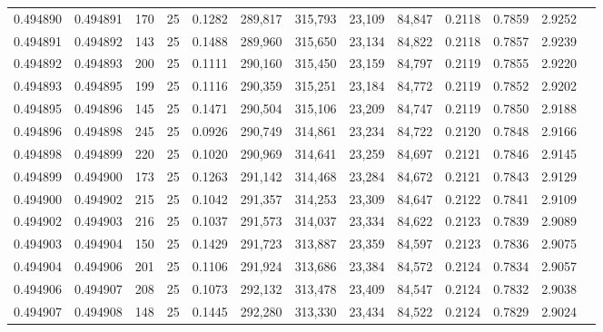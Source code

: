 \begin{tabular}{rrrrrrrrrrrrr}
0.494890 & 0.494891 &   170 &  25 &                                     0.1282 & 289,817 & 315,793 &  23,109 &  84,847 & 0.2118 & 0.7859 & 2.9252 \\
0.494891 & 0.494892 &   143 &  25 &                                     0.1488 & 289,960 & 315,650 &  23,134 &  84,822 & 0.2118 & 0.7857 & 2.9239 \\
0.494892 & 0.494893 &   200 &  25 &                                     0.1111 & 290,160 & 315,450 &  23,159 &  84,797 & 0.2119 & 0.7855 & 2.9220 \\
0.494893 & 0.494895 &   199 &  25 &                                     0.1116 & 290,359 & 315,251 &  23,184 &  84,772 & 0.2119 & 0.7852 & 2.9202 \\
0.494895 & 0.494896 &   145 &  25 &                                     0.1471 & 290,504 & 315,106 &  23,209 &  84,747 & 0.2119 & 0.7850 & 2.9188 \\
0.494896 & 0.494898 &   245 &  25 &                                     0.0926 & 290,749 & 314,861 &  23,234 &  84,722 & 0.2120 & 0.7848 & 2.9166 \\
0.494898 & 0.494899 &   220 &  25 &                                     0.1020 & 290,969 & 314,641 &  23,259 &  84,697 & 0.2121 & 0.7846 & 2.9145 \\
0.494899 & 0.494900 &   173 &  25 &                                     0.1263 & 291,142 & 314,468 &  23,284 &  84,672 & 0.2121 & 0.7843 & 2.9129 \\
0.494900 & 0.494902 &   215 &  25 &                                     0.1042 & 291,357 & 314,253 &  23,309 &  84,647 & 0.2122 & 0.7841 & 2.9109 \\
0.494902 & 0.494903 &   216 &  25 &                                     0.1037 & 291,573 & 314,037 &  23,334 &  84,622 & 0.2123 & 0.7839 & 2.9089 \\
0.494903 & 0.494904 &   150 &  25 &                                     0.1429 & 291,723 & 313,887 &  23,359 &  84,597 & 0.2123 & 0.7836 & 2.9075 \\
0.494904 & 0.494906 &   201 &  25 &                                     0.1106 & 291,924 & 313,686 &  23,384 &  84,572 & 0.2124 & 0.7834 & 2.9057 \\
0.494906 & 0.494907 &   208 &  25 &                                     0.1073 & 292,132 & 313,478 &  23,409 &  84,547 & 0.2124 & 0.7832 & 2.9038 \\
0.494907 & 0.494908 &   148 &  25 &                                     0.1445 & 292,280 & 313,330 &  23,434 &  84,522 & 0.2124 & 0.7829 & 2.9024 \\

\end{tabular}
